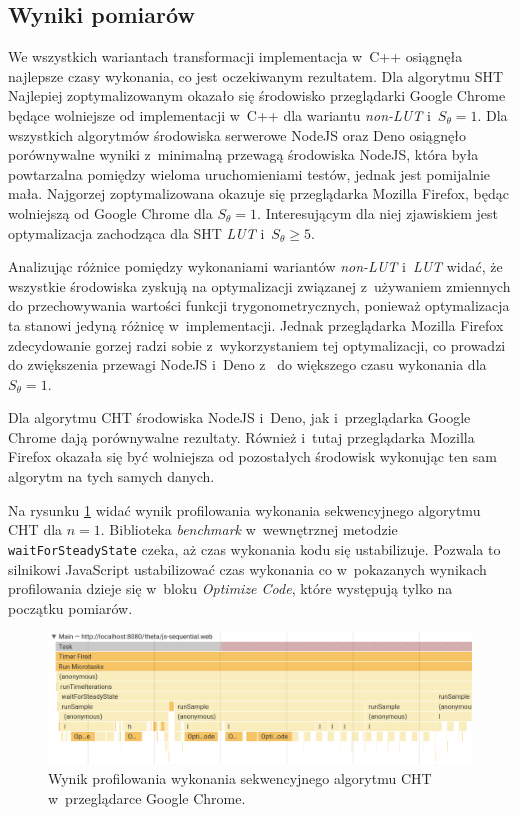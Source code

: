 \subsection{Wyniki pomiarów}

We wszystkich wariantach transformacji implementacja w~C++ osiągnęła najlepsze czasy wykonania, co jest oczekiwanym rezultatem. Dla algorytmu SHT Najlepiej zoptymalizowanym okazało się środowisko przeglądarki Google Chrome będące  wolniejsze od implementacji w~C++ dla wariantu \textit{non-LUT} i~$S_\theta = 1$. Dla wszystkich algorytmów środowiska serwerowe NodeJS oraz Deno osiągnęło porównywalne wyniki z~minimalną przewagą środowiska NodeJS, która była powtarzalna pomiędzy wieloma uruchomieniami testów, jednak jest pomijalnie mała. Najgorzej zoptymalizowana okazuje się przeglądarka Mozilla Firefox, będąc  wolniejszą od Google Chrome dla $S_\theta = 1$. Interesującym dla niej zjawiskiem jest optymalizacja zachodząca dla SHT \textit{LUT} i~$S_\theta \geq 5$. 

Analizując różnice pomiędzy wykonaniami wariantów \textit{non-LUT} i~\textit{LUT} widać, że wszystkie środowiska zyskują na optymalizacji związanej z~używaniem zmiennych do przechowywania wartości funkcji trygonometrycznych, ponieważ optymalizacja ta stanowi jedyną różnicę w~implementacji. Jednak przeglądarka Mozilla Firefox zdecydowanie gorzej radzi sobie z~wykorzystaniem tej optymalizacji, co prowadzi do zwiększenia przewagi NodeJS i~Deno z~ do  większego czasu wykonania dla $S_\theta = 1$.

Dla algorytmu CHT środowiska NodeJS i~Deno, jak i~przeglądarka Google Chrome dają porównywalne rezultaty. Również i~tutaj przeglądarka Mozilla Firefox okazała się być wolniejsza od pozostałych środowisk wykonując ten sam algorytm na tych samych danych.

Na rysunku \ref{fig:profiler-seq} widać wynik profilowania wykonania sekwencyjnego algorytmu CHT dla $n=1$. Biblioteka \textit{benchmark} w~wewnętrznej metodzie \lstinline{waitForSteadyState} czeka, aż czas wykonania kodu się ustabilizuje. Pozwala to silnikowi JavaScript ustabilizować czas wykonania co w~pokazanych wynikach profilowania dzieje się w~bloku \textit{Optimize Code}, które występują tylko na początku pomiarów.

\begin{figure}[h]
    \centering
    \includegraphics[width=\linewidth]{img/seq-profiler.png}
    \caption{Wynik profilowania wykonania sekwencyjnego algorytmu CHT w~przeglądarce Google Chrome.}
    \label{fig:profiler-seq}
\end{figure}


